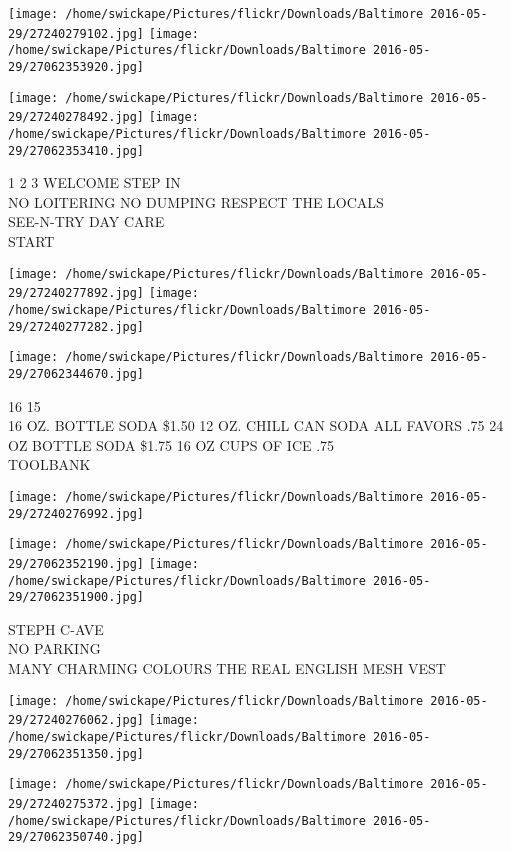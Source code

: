\documentclass[10pt,letterpaper]{article}
\begin{document}
\texttt{[image: /home/swickape/Pictures/flickr/Downloads/Baltimore 2016-05-29/27240279102.jpg]}
\texttt{[image: /home/swickape/Pictures/flickr/Downloads/Baltimore 2016-05-29/27062353920.jpg]}

\texttt{[image: /home/swickape/Pictures/flickr/Downloads/Baltimore 2016-05-29/27240278492.jpg]}
\texttt{[image: /home/swickape/Pictures/flickr/Downloads/Baltimore 2016-05-29/27062353410.jpg]}

1 2 3 WELCOME STEP IN\\
NO LOITERING NO DUMPING RESPECT THE LOCALS\\
SEE{-}N{-}TRY DAY CARE\\
START
\pagebreak

\texttt{[image: /home/swickape/Pictures/flickr/Downloads/Baltimore 2016-05-29/27240277892.jpg]}
\texttt{[image: /home/swickape/Pictures/flickr/Downloads/Baltimore 2016-05-29/27240277282.jpg]}

\texttt{[image: /home/swickape/Pictures/flickr/Downloads/Baltimore 2016-05-29/27062344670.jpg]}

16 15\\
16 OZ. BOTTLE SODA \$1.50 12 OZ. CHILL CAN SODA ALL FAVORS .75 24 OZ BOTTLE SODA \$1.75 16 OZ CUPS OF ICE .75\\
TOOLBANK
\pagebreak

\texttt{[image: /home/swickape/Pictures/flickr/Downloads/Baltimore 2016-05-29/27240276992.jpg]}

\vspace{0.25in}
\texttt{[image: /home/swickape/Pictures/flickr/Downloads/Baltimore 2016-05-29/27062352190.jpg]}
\texttt{[image: /home/swickape/Pictures/flickr/Downloads/Baltimore 2016-05-29/27062351900.jpg]}

STEPH C{-}AVE\\
NO PARKING\\
MANY CHARMING COLOURS THE REAL ENGLISH MESH VEST
\pagebreak

\texttt{[image: /home/swickape/Pictures/flickr/Downloads/Baltimore 2016-05-29/27240276062.jpg]}
\texttt{[image: /home/swickape/Pictures/flickr/Downloads/Baltimore 2016-05-29/27062351350.jpg]}

\texttt{[image: /home/swickape/Pictures/flickr/Downloads/Baltimore 2016-05-29/27240275372.jpg]}
\texttt{[image: /home/swickape/Pictures/flickr/Downloads/Baltimore 2016-05-29/27062350740.jpg]}
\end{document}
